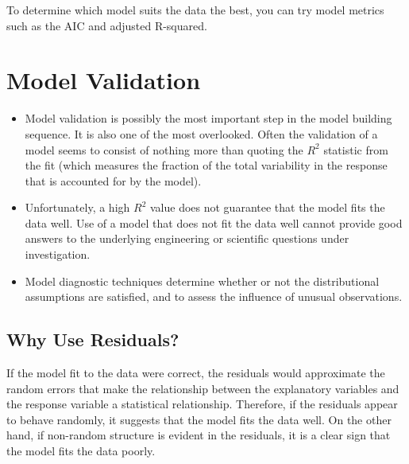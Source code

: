 \documentclass[residuals.tex]{subfiles}
\begin{document}
To determine which model suits the data the best, you can try model metrics such as the AIC and adjusted R-squared.


\newpage
\section*{Model Validation}
\begin{itemize}
\item Model validation is possibly the most important step in the model building sequence. It is also one of the most overlooked. Often the validation of a model seems to consist of nothing more than quoting the $R^2$ statistic from the fit (which measures the fraction of the total variability in the response that is accounted for by the model). 

\item Unfortunately, a high $R^2$ value does not guarantee that the model fits the data well. Use of a model that does not fit the data well cannot provide good answers to the underlying engineering or scientific questions under investigation.

\item Model diagnostic techniques determine whether or not the distributional assumptions are satisfied, and to assess the influence of unusual observations.

\end{itemize}


\subsection*{Why Use Residuals?}

If the model fit to the data were correct, the residuals would approximate the random errors that make the relationship between the explanatory variables and the response variable a statistical relationship. Therefore, if the residuals appear to behave randomly, it suggests that the model fits the data well. On the other hand, if non-random structure is evident in the residuals, it is a clear sign that the model fits the data poorly. 

\end{document}
